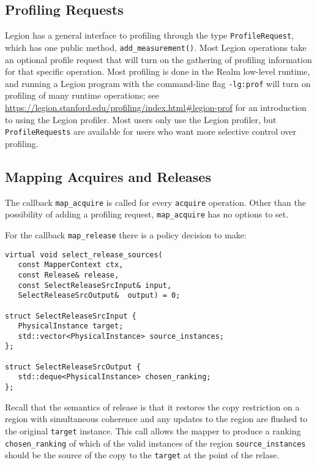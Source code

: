 \subsection{Profiling Requests}
\label{subsec:mapping:profiling}

Legion has a general interface to profiling through the type {\tt ProfileRequest}, which has one public method, {\tt add\_measurement()}.
Most Legion operations take an optional profile request that will turn on the gathering of profiling information for that specific operation.
Most profiling is done in the Realm low-level runtime, and running a Legion program with the command-line flag {\tt -lg:prof} will turn on
profiling of many runtime operations; see \url{https://legion.stanford.edu/profiling/index.html#legion-prof} for an introduction to using
the Legion profiler.  Most users only use the Legion profiler, but {\tt ProfileRequests} are available for users who want more
selective control over profiling.


\subsection{Mapping Acquires and Releases}
\label{subsec:mapping:acquires}

The callback {\tt map\_acquire} is called for every {\tt acquire} operation.  Other than the possibility of adding a profiling request, {\tt map\_acquire} has no options to set.

For the callback {\tt map\_release} there is a policy decision to make:
\begin{lstlisting}
virtual void select_release_sources(
   const MapperContext ctx,
   const Release& release,
   const SelectReleaseSrcInput& input,
   SelectReleaseSrcOutput&  output) = 0;

struct SelectReleaseSrcInput {
   PhysicalInstance target;
   std::vector<PhysicalInstance> source_instances;
};

struct SelectReleaseSrcOutput {
   std::deque<PhysicalInstance> chosen_ranking;
};
\end{lstlisting}
Recall that the semantics of release is that it restores the copy restriction on a region with simultaneous coherence and any updates
to the region are flushed to the original {\tt target} instance.  This call allows the mapper to produce a ranking {\tt chosen\_ranking} of
which of the valid instances of the region {\tt source\_instances} should be the source of the copy to the {\tt target} at the point of the relase.

